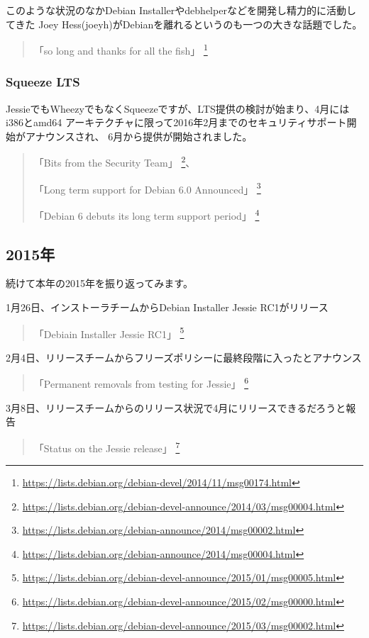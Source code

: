 \documentclass[mingoth,a4paper]{jsarticle}
\begin{document}
このような状況のなかDebian Installerやdebhelperなどを開発し精力的に活動してきた
Joey Hess(joeyh)がDebianを離れるというのも一つの大きな話題でした。

\begin{quote}
  「so long and thanks for all the fish」
  \footnote{\url{https://lists.debian.org/debian-devel/2014/11/msg00174.html}}
\end{quote}


\subsubsection{Squeeze LTS}

JessieでもWheezyでもなくSqueezeですが、LTS提供の検討が始まり、4月にはi386とamd64
アーキテクチャに限って2016年2月までのセキュリティサポート開始がアナウンスされ、
6月から提供が開始されました。

\begin{quote}
  「Bits from the Security Team」
  \footnote{\url{https://lists.debian.org/debian-devel-announce/2014/03/msg00004.html}}、

  「Long term support for Debian 6.0 Announced」
  \footnote{\url{https://lists.debian.org/debian-announce/2014/msg00002.html}}

  「Debian 6 debuts its long term support period」
  \footnote{\url{https://lists.debian.org/debian-announce/2014/msg00004.html}}
\end{quote}


\subsection{2015年}

続けて本年の2015年を振り返ってみます。

1月26日、インストーラチームからDebian Installer Jessie RC1がリリース
\begin{quote}
  「Debiain Installer Jessie RC1」
  \footnote{\url{https://lists.debian.org/debian-devel-announce/2015/01/msg00005.html}}
\end{quote}

2月4日、リリースチームからフリーズポリシーに最終段階に入ったとアナウンス
\begin{quote}
  「Permanent removals from testing for Jessie」
  \footnote{\url{https://lists.debian.org/debian-devel-announce/2015/02/msg00000.html}}
\end{quote}

3月8日、リリースチームからのリリース状況で4月にリリースできるだろうと報告
\begin{quote}
  「Status on the Jessie release」
  \footnote{\url{https://lists.debian.org/debian-devel-announce/2015/03/msg00002.html}}
\end{quote}
\end{document}
